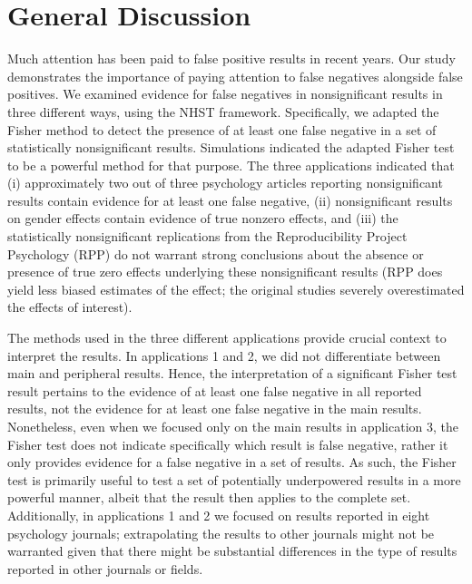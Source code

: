 \documentclass[a5paper]{book}
\begin{document}
\section{General Discussion}\label{general-discussion}

Much attention has been paid to false positive results in recent years.
Our study demonstrates the importance of paying attention to false
negatives alongside false positives. We examined evidence for false
negatives in nonsignificant results in three different ways, using the
NHST framework. Specifically, we adapted the Fisher method to detect the
presence of at least one false negative in a set of statistically
nonsignificant results. Simulations indicated the adapted Fisher test to
be a powerful method for that purpose. The three applications indicated
that (i) approximately two out of three psychology articles reporting
nonsignificant results contain evidence for at least one false negative,
(ii) nonsignificant results on gender effects contain evidence of true
nonzero effects, and (iii) the statistically nonsignificant replications
from the Reproducibility Project Psychology (RPP) do not warrant strong
conclusions about the absence or presence of true zero effects
underlying these nonsignificant results (RPP does yield less biased
estimates of the effect; the original studies severely overestimated the
effects of interest).

The methods used in the three different applications provide crucial
context to interpret the results. In applications 1 and 2, we did not
differentiate between main and peripheral results. Hence, the
interpretation of a significant Fisher test result pertains to the
evidence of at least one false negative in all reported results, not the
evidence for at least one false negative in the main results.
Nonetheless, even when we focused only on the main results in
application 3, the Fisher test does not indicate specifically which
result is false negative, rather it only provides evidence for a false
negative in a set of results. As such, the Fisher test is primarily
useful to test a set of potentially underpowered results in a more
powerful manner, albeit that the result then applies to the complete
set. Additionally, in applications 1 and 2 we focused on results
reported in eight psychology journals; extrapolating the results to
other journals might not be warranted given that there might be
substantial differences in the type of results reported in other
journals or fields.
\end{document}
